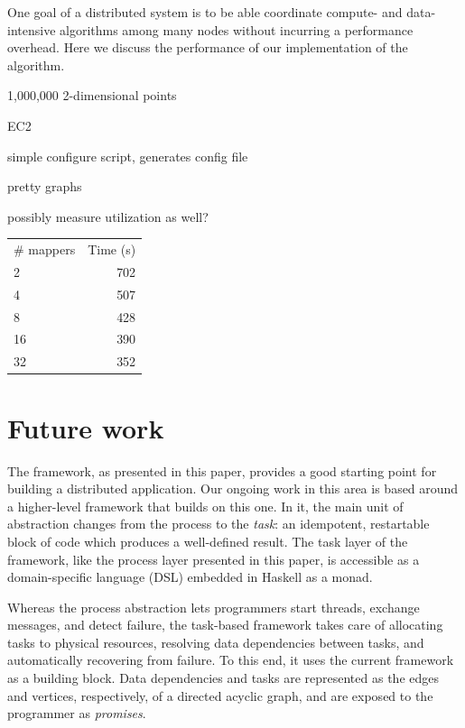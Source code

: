 \documentclass[preprint]{sigplanconf}
\begin{document}
One goal of a distributed system is to be able coordinate compute- and data-intensive algorithms among many nodes without incurring a performance overhead. Here we discuss the performance of our implementation of the \kmeans algorithm.

1,000,000 2-dimensional points

EC2

simple configure script, generates config file

pretty graphs

possibly measure utilization as well?

\begin{center}
\begin{table}[h]

\begin{tabular}{l r}
\hline
  \# mappers & Time (s) \\
  2 & 702 \\
  4 & 507 \\
  8 & 428 \\
  16 & 390 \\
  32 & 352 \\
\hline
\end{tabular}
\end{table}
\end{center}


\section{Future work}
\label{s:futureWork}
The framework, as presented in this paper, provides a good starting point for building a distributed application. Our ongoing work in this area is based around a higher-level framework that builds on this one. In it, the main unit of abstraction changes from the process to the {\em task}: an idempotent, restartable block of code which produces a well-defined result. The task layer of the framework, like the process layer presented in this paper, is accessible as a domain-specific language (DSL) embedded in Haskell as a monad.

Whereas the process abstraction lets programmers start threads, exchange messages, and detect failure, the task-based framework takes care of allocating tasks to physical resources, resolving data dependencies between tasks, and automatically recovering from failure. To this end, it uses the current framework as a building block. Data dependencies and tasks are represented as the edges and vertices, respectively, of a directed acyclic graph, and are exposed to the programmer as {\em promises}.
\end{document}
